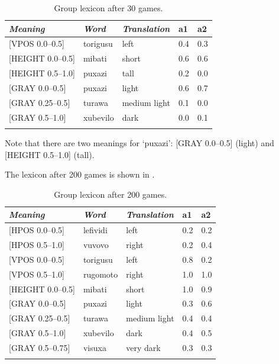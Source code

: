 \begin{table} 
\begin{center}
\begin{tabular}{ l  l  l  l  l }
\lsptoprule
{\itshape Meaning}&{\itshape Word}&{\itshape Translation} & {\bfshape  a1}&{\bfshape  a2} \\ \midrule
{}[VPOS 0.0–0.5] &torigusu&left&0.4&0.3\\ 
{}[HEIGHT 0.0–0.5]&mibati&short &0.6&0.6\\ 
{}[HEIGHT 0.5–1.0]&puxazi&tall &0.2&0.0\\ 
{}[GRAY 0.0–0.5]& puxazi&light &0.6&0.7\\ 
{}[GRAY 0.25–0.5]&turawa&medium light&0.1&0.0\\ 
{}[GRAY 0.5–1.0]& xubevilo&dark &0.0&0.1\\ 
\lspbottomrule
\end{tabular}
\caption{\label{tab:after30}Group lexicon after 30 games.}
\end{center}
\end{table}

Note that there are two meanings for `puxazi': 
{}[GRAY 0.0–0.5] (light) and [HEIGHT 0.5–1.0] (tall). 

The lexicon after 200 games is shown in . 


\begin{table} 
\begin{center}
\begin{tabular}{ l  l  l  l  l }
\lsptoprule
{\itshape Meaning}&{\itshape Word}&{\itshape Translation} & {\bfshape  a1}&{\bfshape  a2} \\ \midrule
{}[HPOS 0.0–0.5] &lefividi&left&0.2&0.2\\ 
{}[HPOS 0.5–1.0] &vuvovo&right&0.2&0.4\\ 
{}[VPOS 0.0–0.5] &torigusu&left&0.8&0.2\\ 
{}[VPOS 0.5–1.0] &rugomoto&right&1.0&1.0\\ 
{}[HEIGHT 0.0–0.5]&mibati&short &1.0&0.9\\ 
{}[GRAY 0.0–0.5]& puxazi&light &0.3&0.6\\ 
{}[GRAY 0.25–0.5]&turawa&medium light&0.4&0.4\\ 
{}[GRAY 0.5–1.0]& xubevilo&dark &0.4&0.5\\ 
{}[GRAY 0.5–0.75]& visuxa&very dark &0.3&0.3\\ 
\lspbottomrule
\end{tabular}
\caption{\label{tab:after200}Group lexicon after 200 games.}
\end{center}
\end{table}

